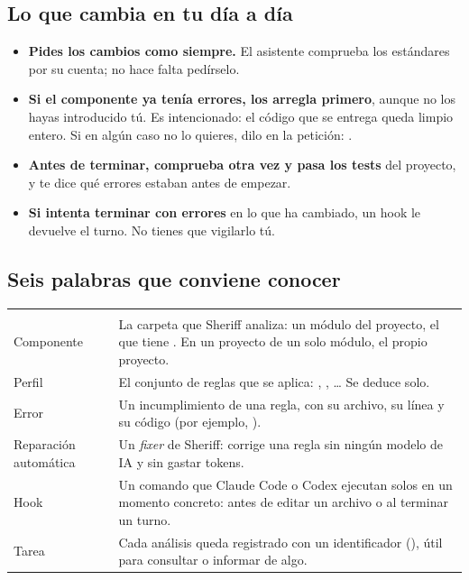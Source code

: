 \documentclass[11pt,a4paper]{article}
\begin{document}
\subsection{Lo que cambia en tu día a día}

\begin{itemize}
  \item \textbf{Pides los cambios como siempre.} El asistente comprueba los
        estándares por su cuenta; no hace falta pedírselo.
  \item \textbf{Si el componente ya tenía errores, los arregla primero}, aunque
        no los hayas introducido tú. Es intencionado: el código que se entrega
        queda limpio entero. Si en algún caso no lo quieres, dilo en la
        petición: .
  \item \textbf{Antes de terminar, comprueba otra vez y pasa los tests} del
        proyecto, y te dice qué errores estaban antes de empezar.
  \item \textbf{Si intenta terminar con errores} en lo que ha cambiado, un hook
        le devuelve el turno. No tienes que vigilarlo tú.
\end{itemize}

\subsection{Seis palabras que conviene conocer}

\begin{center}
\begin{tabularx}{\linewidth}{@{\hspace{6pt}}K{33mm}L}
\headrow {} &  \\
Componente & La carpeta que Sheriff analiza: un módulo del proyecto, el que
             tiene . En un proyecto de un solo módulo, el propio
             proyecto. \\
Perfil & El conjunto de reglas que se aplica: ,
         , \ldots{} Se deduce solo. \\
Error & Un incumplimiento de una regla, con su archivo, su línea y su código
        (por ejemplo, ). \\
Reparación automática & Un \emph{fixer} de Sheriff: corrige una regla sin
        ningún modelo de IA y sin gastar tokens. \\
Hook & Un comando que Claude Code o Codex ejecutan solos en un momento
       concreto: antes de editar un archivo o al terminar un turno. \\
Tarea & Cada análisis queda registrado con un identificador
        (), útil para consultar o informar de algo. \\
\end{tabularx}
\end{center}
\end{document}
